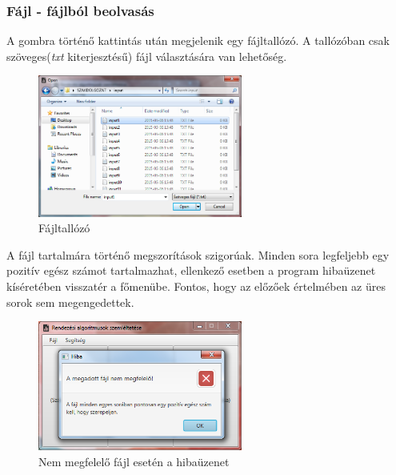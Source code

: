 \documentclass{elteikthesis}
\begin{document}
\subsubsection{Fájl - fájlból beolvasás}
A gombra történő kattintás után megjelenik egy fájltallózó. A tallózóban csak szöveges(\emph{txt} kiterjesztésű) fájl választására van lehetőség.
\begin{figure}[H]
	\centering
	\includegraphics[width=0.6\textwidth]{pics/fileinput.png}
	\caption{Fájltallózó}
\end{figure}
 A fájl tartalmára történő megszorítások szigorúak. Minden sora legfeljebb egy pozitív egész számot tartalmazhat, ellenkező esetben a program hibaüzenet kíséretében visszatér a főmenübe. Fontos, hogy az előzőek értelmében az üres sorok sem megengedettek.
 \begin{figure}[H]
 	\centering
 	\includegraphics[width=0.6\textwidth]{pics/fileinput_error.png}
 	\caption{Nem megfelelő fájl esetén a hibaüzenet}
 \end{figure}
\end{document}
